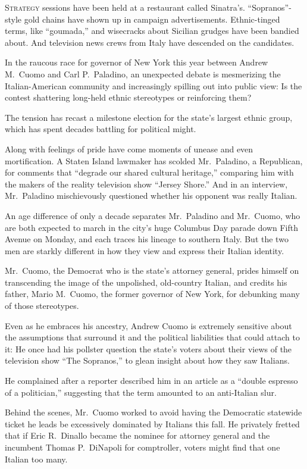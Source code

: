 ﻿\documentclass[12pt]{article}
\begin{document}
\lettrine{S}{trategy} sessions have been held at a restaurant called
Sinatra's. ``Sopranos''-style gold chains have shown up in campaign advertisements. Ethnic-tinged
terms, like ``goumada,'' and wisecracks about Sicilian grudges have been bandied about. And
television news crews from Italy have descended on the candidates.

In the raucous race for governor of New York this year between Andrew M.~Cuomo and Carl P.~Paladino,
an unexpected debate is mesmerizing the Italian-American community and increasingly spilling out
into public view: Is the contest shattering long-held ethnic stereotypes or reinforcing them?

The tension has recast a milestone election for the state's largest ethnic group, which has spent
decades battling for political might.

Along with feelings of pride have come moments of unease and even mortification. A Staten Island
lawmaker has scolded Mr.~Paladino, a Republican, for comments that ``degrade our shared cultural
heritage,'' comparing him with the makers of the reality television show ``Jersey Shore.'' And in an
interview, Mr.~Paladino mischievously questioned whether his opponent was really Italian.

An age difference of only a decade separates Mr.~Paladino and Mr.~Cuomo, who are both expected to
march in the city's huge Columbus Day parade down Fifth Avenue on Monday, and each traces his
lineage to southern Italy. But the two men are starkly different in how they view and express their
Italian identity.

Mr.~Cuomo, the Democrat who is the state's attorney general, prides himself on transcending the
image of the unpolished, old-country Italian, and credits his father, Mario M.~Cuomo, the former
governor of New York, for debunking many of those stereotypes.

Even as he embraces his ancestry, Andrew Cuomo is extremely sensitive about the assumptions that
surround it and the political liabilities that could attach to it: He once had his pollster question
the state's voters about their views of the television show ``The Sopranos,'' to glean insight about
how they saw Italians.

He complained after a reporter described him in an article as a ``double espresso of a politician,''
suggesting that the term amounted to an anti-Italian slur.

Behind the scenes, Mr.~Cuomo worked to avoid having the Democratic statewide ticket he leads be
excessively dominated by Italians this fall. He privately fretted that if Eric R.~Dinallo became the
nominee for attorney general and the incumbent Thomas P.~DiNapoli for comptroller, voters might find
that one Italian too many.
\end{document}

